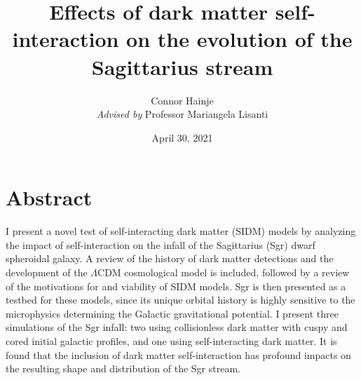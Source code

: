 \documentclass[12pt,oneside]{book}
\title{Effects of dark matter self-interaction on the evolution of the Sagittarius stream}
\author{Connor Hainje\\\textit{Advised by} Professor Mariangela Lisanti}
\date{April 30, 2021}
\begin{document}
\maketitle

\onehalfspacing
{}

\chapter*{Abstract}

I present a novel test of self-interacting dark matter (SIDM) models by
analyzing the impact of self-interaction on the infall of the Sagittarius
(Sgr) dwarf spheroidal galaxy.  A review of the history of dark matter
detections and the development of the $\Lambda$CDM cosmological model is
included, followed by a review of the motivations for and viability of SIDM
models. Sgr is then presented as a testbed for these models, since its unique
orbital history is highly sensitive to the microphysics determining the Galactic
gravitational potential. I present three simulations of the Sgr infall: two
using collisionless dark matter with cuspy and cored initial galactic profiles,
and one using self-interacting dark matter.  It is found that the inclusion of
dark matter self-interaction has profound impacts on the resulting shape and
distribution of the Sgr stream.


\newpage

\singlespacing
\tableofcontents 
\newpage

\onehalfspacing







% 
% 

\printbibliography
\end{document}
